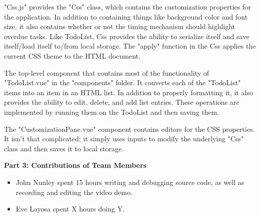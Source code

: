 \documentclass[12pt]{article}
\begin{document}
\begin{flushleft}
"Css.js" provides the "Css" class, which contains the customization properties for the application. In addition to containing things like background color and font size, it also contains whether or not the timing mechanism should highlight overdue tasks. Like TodoList, Css provides the ability to serialize itself and save itself/load itself to/from local storage. The "apply" function in the Css applies the current CSS theme to the HTML document.

The top-level component that contains most of the functionality of "TodoList.vue" in the "components" folder. It converts each of the "TodoList" items into an item in an HTML list. In addition to properly formatting it, it also provides the ability to edit, delete, and add list entries. These operations are implemented by running them on the TodoList and then saving them.

The "CustomizationPane.vue" component contains editors for the CSS properties. It isn't that complicated; it simply uses inputs to modify the underlying "Css" class and then saves it to local storage.

\textbf{Part 3: Contributions of Team Members}

\begin{itemize}
    \item John Nunley spent 15 hours writing and debugging source code, as well as recording and editing the video demo.
    \item Eve Layosa spent X hours doing Y.
\end{itemize}

\end{flushleft}
\end{document}
